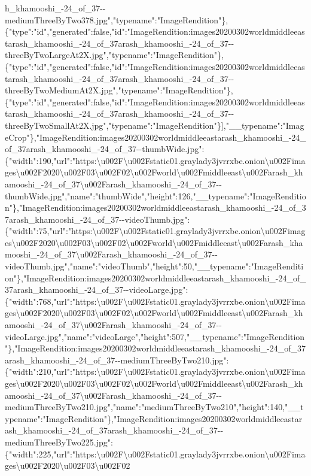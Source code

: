 h\_khamooshi\_-24\_of\_37-\/-mediumThreeByTwo378.jpg","typename":"ImageRendition"\},\{"type":"id","generated":false,"id":"ImageRendition:images20200302worldmiddleeastarash\_khamooshi\_-24\_of\_37arash\_khamooshi\_-24\_of\_37-\/-threeByTwoLargeAt2X.jpg","typename":"ImageRendition"\},\{"type":"id","generated":false,"id":"ImageRendition:images20200302worldmiddleeastarash\_khamooshi\_-24\_of\_37arash\_khamooshi\_-24\_of\_37-\/-threeByTwoMediumAt2X.jpg","typename":"ImageRendition"\},\{"type":"id","generated":false,"id":"ImageRendition:images20200302worldmiddleeastarash\_khamooshi\_-24\_of\_37arash\_khamooshi\_-24\_of\_37-\/-threeByTwoSmallAt2X.jpg","typename":"ImageRendition"\}{]},"\_\_typename":"ImageCrop"\},"ImageRendition:images20200302worldmiddleeastarash\_khamooshi\_-24\_of\_37arash\_khamooshi\_-24\_of\_37-\/-thumbWide.jpg":\{"width":190,"url":"https:\textbackslash{}u002F\textbackslash{}u002Fstatic01.graylady3jvrrxbe.onion\textbackslash{}u002Fimages\textbackslash{}u002F2020\textbackslash{}u002F03\textbackslash{}u002F02\textbackslash{}u002Fworld\textbackslash{}u002Fmiddleeast\textbackslash{}u002Farash\_khamooshi\_-24\_of\_37\textbackslash{}u002Farash\_khamooshi\_-24\_of\_37-\/-thumbWide.jpg","name":"thumbWide","height":126,"\_\_typename":"ImageRendition"\},"ImageRendition:images20200302worldmiddleeastarash\_khamooshi\_-24\_of\_37arash\_khamooshi\_-24\_of\_37-\/-videoThumb.jpg":\{"width":75,"url":"https:\textbackslash{}u002F\textbackslash{}u002Fstatic01.graylady3jvrrxbe.onion\textbackslash{}u002Fimages\textbackslash{}u002F2020\textbackslash{}u002F03\textbackslash{}u002F02\textbackslash{}u002Fworld\textbackslash{}u002Fmiddleeast\textbackslash{}u002Farash\_khamooshi\_-24\_of\_37\textbackslash{}u002Farash\_khamooshi\_-24\_of\_37-\/-videoThumb.jpg","name":"videoThumb","height":50,"\_\_typename":"ImageRendition"\},"ImageRendition:images20200302worldmiddleeastarash\_khamooshi\_-24\_of\_37arash\_khamooshi\_-24\_of\_37-\/-videoLarge.jpg":\{"width":768,"url":"https:\textbackslash{}u002F\textbackslash{}u002Fstatic01.graylady3jvrrxbe.onion\textbackslash{}u002Fimages\textbackslash{}u002F2020\textbackslash{}u002F03\textbackslash{}u002F02\textbackslash{}u002Fworld\textbackslash{}u002Fmiddleeast\textbackslash{}u002Farash\_khamooshi\_-24\_of\_37\textbackslash{}u002Farash\_khamooshi\_-24\_of\_37-\/-videoLarge.jpg","name":"videoLarge","height":507,"\_\_typename":"ImageRendition"\},"ImageRendition:images20200302worldmiddleeastarash\_khamooshi\_-24\_of\_37arash\_khamooshi\_-24\_of\_37-\/-mediumThreeByTwo210.jpg":\{"width":210,"url":"https:\textbackslash{}u002F\textbackslash{}u002Fstatic01.graylady3jvrrxbe.onion\textbackslash{}u002Fimages\textbackslash{}u002F2020\textbackslash{}u002F03\textbackslash{}u002F02\textbackslash{}u002Fworld\textbackslash{}u002Fmiddleeast\textbackslash{}u002Farash\_khamooshi\_-24\_of\_37\textbackslash{}u002Farash\_khamooshi\_-24\_of\_37-\/-mediumThreeByTwo210.jpg","name":"mediumThreeByTwo210","height":140,"\_\_typename":"ImageRendition"\},"ImageRendition:images20200302worldmiddleeastarash\_khamooshi\_-24\_of\_37arash\_khamooshi\_-24\_of\_37-\/-mediumThreeByTwo225.jpg":\{"width":225,"url":"https:\textbackslash{}u002F\textbackslash{}u002Fstatic01.graylady3jvrrxbe.onion\textbackslash{}u002Fimages\textbackslash{}u002F2020\textbackslash{}u002F03\textbackslash{}u002F02\textbacks